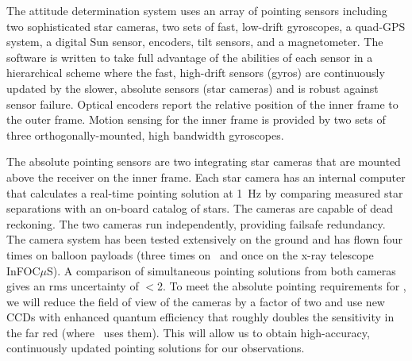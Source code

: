 The attitude determination system uses an array of pointing sensors
including two sophisticated star cameras, two sets of fast, low-drift
gyroscopes, a quad-GPS system, a digital Sun sensor, encoders, tilt
sensors, and a magnetometer.  The software is written to take full
advantage of the abilities of each sensor in a hierarchical scheme
where the fast, high-drift sensors (gyros) are continuously updated by
the slower, absolute sensors (star cameras) and is robust against
sensor failure.
Optical encoders report the relative position of the inner frame to
the outer frame.  Motion sensing for the inner frame is provided by
two sets of three orthogonally-mounted, high bandwidth gyroscopes.

The absolute pointing sensors are two integrating star cameras
 that are mounted above the receiver on the inner frame.
Each star camera has an internal computer that calculates a real-time
pointing solution at 1~Hz by comparing measured star separations with
an on-board catalog of stars.  The cameras are capable of dead
reckoning.  The two cameras run independently, providing failsafe
redundancy.
The camera system has been tested extensively on the ground and has
flown four times on balloon payloads (three times on \blast\ and once
on the x-ray telescope InFOC$\mu$S).  
A comparison of simultaneous pointing solutions from both cameras
gives an rms uncertainty of $<$2\arcsec.  To meet the absolute
pointing requirements for \name, we will reduce the field of view of
the cameras by a factor of two and use new CCDs with enhanced quantum
efficiency that roughly doubles the sensitivity in the far red (where
\name\ uses them).  This will allow us to obtain high-accuracy,
continuously updated pointing solutions for our observations.

% 
